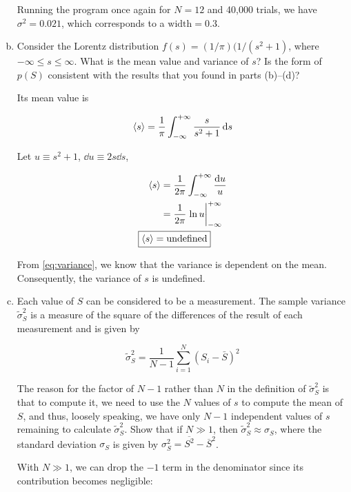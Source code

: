 \documentclass[9pt,a4paper,twocolumn]{article}
\begin{document}
\begin{enumerate}[(a)]
Running the program once again for $N=12$ and 40,000 trials, we have $\sigma^2 = 0.021$, which corresponds to a $\boxed{\mathrm{width} = 0.3}$.

\item Consider the Lorentz distribution $f(s) = (1/\pi)(1/(s^2 + 1)$, where $-\infty \leq s \leq \infty$. What is the mean value and variance of $s$? Is the form of $p(S)$ consistent with the results that you found in parts (b)–(d)?

Its mean value is

\begin{equation}
	\ev{s} = \frac{1}{\pi} \int_{-\infty}^{+\infty} \frac{s}{s^2 +1} \dd{s}
\end{equation}

Let $u \equiv s^2 + 1$, $\dd{u} \equiv 2s\dd{s}$,

\begin{align}
	\ev{s} &= \frac{1}{2\pi} \int_{-\infty}^{+\infty} \frac{\dd{u}}{u} \nonumber \\
	&= \frac{1}{2\pi} \eval{\ln u}_{-\infty}^{+\infty} \nonumber \\
	\Aboxed{
		\ev{s} &= \mathrm{undefined}
	} \label{eq:answer-e-mean}
\end{align}

From \eqref{eq:variance}, we know that the variance is dependent on the mean. Consequently, the variance of $s$ is undefined.

\item Each value of $S$ can be considered to be a measurement. The sample variance $\tilde{\sigma}_S^2$ is a measure of the square of the differences of the result of each measurement and is given by

\begin{equation}
	\tilde{\sigma}_S^2 = \frac{1}{N-1}\sum_{i=1}^N (S_i - \bar{S})^2
\end{equation}

The reason for the factor of $N-1$ rather than $N$ in the definition of $\tilde{\sigma}_S^2$ is that to compute it, we need to use the $N$ values of $s$ to compute the mean of $S$, and thus, loosely speaking, we have only $N-1$ independent values of $s$ remaining to calculate $\tilde{\sigma}_S^2$. Show that if $N \gg 1$, then
$\tilde{\sigma}_S^2 \approx \sigma_S$, where the standard deviation $\sigma_S$ is given by $\sigma_S^2 = \overline{S^2} - \overline{S}^2$.

With $N \gg 1$, we can drop the $-1$ term in the denominator since its contribution becomes negligible:


\end{enumerate}
\end{document}
